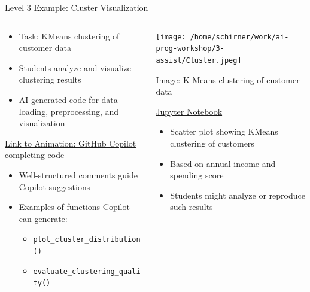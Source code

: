 \documentclass[xcolor=dvipsnames, aspectratio=169]{beamer}
\begin{document}
\begin{frame}{Level 3 Example: Cluster Visualization}
  \begin{columns}
    \begin{column}{0.6\textwidth}
      \begin{itemize}
        \item Task: KMeans clustering of customer data
        \item Students analyze and visualize clustering results
        \item AI-generated code for data loading, preprocessing, and visualization
      \end{itemize}
      \vspace{0.5em}
      \href{https://github.com/neu-ece-esl/ai-prog-workshop/tree/main/3-assist}{Link to Animation: GitHub Copilot completing code}
      \vspace{0.5em}
      \begin{itemize}
        \item Well-structured comments guide Copilot suggestions
        \item Examples of functions Copilot can generate:
        \begin{itemize}
          \item \texttt{plot\_cluster\_distribution()}
          \item \texttt{evaluate\_clustering\_quality()}
        \end{itemize}
      \end{itemize}
    \end{column}
    
    \begin{column}{0.4\textwidth}
      \texttt{[image: /home/schirner/work/ai-prog-workshop/3-assist/Cluster.jpeg]}
      \tiny\centerline{Image: K-Means clustering of customer data}
      \tiny\centerline{\href{https://github.com/neu-ece-esl/ai-prog-workshop/blob/main/3-assist/KMeans_Clustering.ipynb}{Jupyter Notebook}}

      \begin{itemize}
        \item Scatter plot showing KMeans clustering of customers
        \item Based on annual income and spending score
        \item Students might analyze or reproduce such results
      \end{itemize}
    \end{column}
  \end{columns}
\end{frame}
\end{document}
